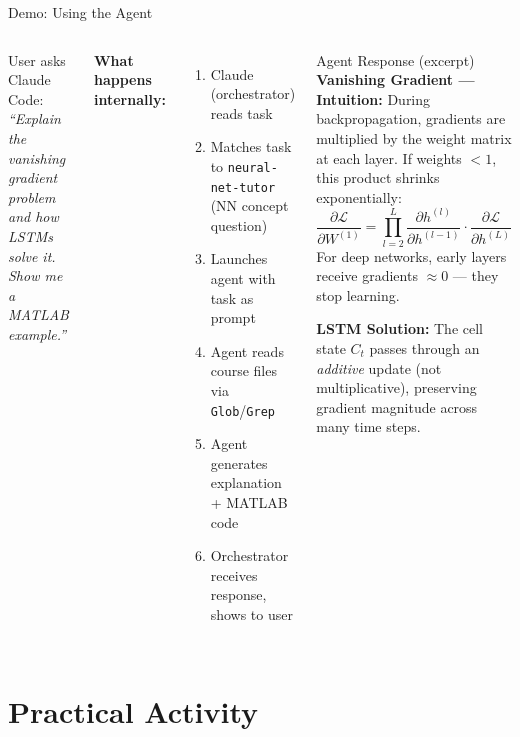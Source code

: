 \documentclass[aspectratio=169,xcolor=dvipsnames]{beamer}
\begin{document}
\begin{frame}{Demo: Using the Agent}
    \begin{columns}
        \begin{block}{User asks Claude Code:}
            \textit{``Explain the vanishing gradient problem and how LSTMs solve it. Show me a MATLAB example.''}
        \end{block}
        \vspace{0.2cm}
        \textbf{What happens internally:}
        \begin{enumerate}
            \item Claude (orchestrator) reads task
            \item Matches task to \texttt{neural-net-tutor} (NN concept question)
            \item Launches agent with task as prompt
            \item Agent reads course files via \texttt{Glob}/\texttt{Grep}
            \item Agent generates explanation + MATLAB code
            \item Orchestrator receives response, shows to user
        \end{enumerate}

        \begin{exampleblock}{Agent Response (excerpt)}
            \textbf{Vanishing Gradient --- Intuition:}
            During backpropagation, gradients are multiplied by the weight matrix at each layer. If weights $< 1$, this product shrinks exponentially:
            $$\frac{\partial \mathcal{L}}{\partial W^{(1)}} = \prod_{l=2}^{L} \frac{\partial h^{(l)}}{\partial h^{(l-1)}} \cdot \frac{\partial \mathcal{L}}{\partial h^{(L)}}$$
            For deep networks, early layers receive gradients $\approx 0$ --- they stop learning.

            \vspace{0.2cm}
            \textbf{LSTM Solution:} The cell state $C_t$ passes through an \emph{additive} update (not multiplicative), preserving gradient magnitude across many time steps.
        \end{exampleblock}
    \end{columns}
\end{frame}

\section{Practical Activity}
\end{document}
